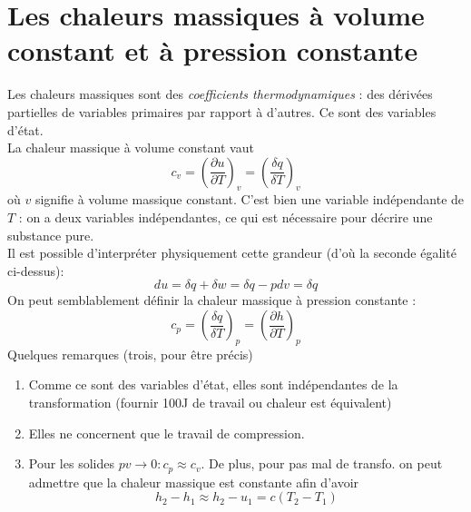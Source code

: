 \section{Les chaleurs massiques à volume constant et à pression 
constante}
Les chaleurs massiques sont des \textit{coefficients thermodynamiques} : 
des dérivées partielles de variables primaires par rapport à d'autres. 
Ce sont des variables d'état. \\
La chaleur massique à volume constant vaut
\begin{equation}
c_v = \left(\frac{\partial u}{\partial T}\right)_v = \left(\frac{\delta 
q}{\delta T}\right)_v
\end{equation}
où $v$ signifie à volume massique constant. C'est bien une variable 
indépendante de $T$ : on a deux variables indépendantes, ce qui est 
nécessaire pour décrire une substance pure.\\
Il est possible d’interpréter physiquement cette grandeur (d'où la 
seconde égalité ci-dessus):
\begin{equation}
du = \delta q + \delta w = \delta q - pdv = \delta q
\end{equation}
On peut semblablement définir la chaleur massique à pression constante :
\begin{equation}
c_p = \left(\frac{\delta q}{\delta T}\right)_p = \left(\frac{\partial h}{
\partial T}\right)_p
\end{equation}
Quelques remarques (trois, pour être précis)
\begin{enumerate}
\item Comme ce sont des variables d'état, elles sont indépendantes de 
la transformation (fournir 100J de travail ou chaleur est équivalent)
\item Elles ne concernent que le travail de compression.
\item Pour les solides $pv \rightarrow 0 : c_p\approx c_v$. De plus, 
pour pas mal de transfo. on peut admettre que la chaleur massique est 
constante afin d'avoir
\begin{equation}
h_2-h_1\approx h_2-u_1 = c(T_2-T_1)
\end{equation}
\end{enumerate}


